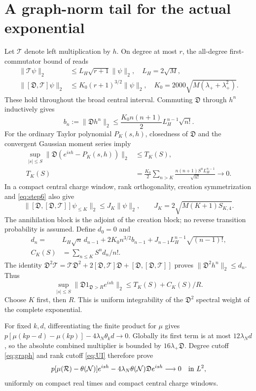 \documentclass[11pt]{article}
\newcommand{\NN}{\mathcal N}
\newcommand{\RR}{\mathcal R}
\newcommand{\DD}{\mathfrak D}
\newcommand{\thN}{\theta(\NN)}
\begin{document}
\newpage
\section{A graph-norm tail for the actual exponential}
Let $\mathcal T$ denote left multiplication by $h$. On degree at most $r$,
the all-degree first-commutator bound of \cite{Rank} reads
\begin{align}
 \|\mathcal T\psi\|_2&\le L_H\sqrt{r+1}\|\psi\|_2,
 \quad L_H=2\sqrt M,\\
 \|[\DD,\mathcal T]\psi\|_2&\le K_0(r+1)^{3/2}\|\psi\|_2,
 \quad K_0=2000\sqrt{M(\lambda_++\lambda_+^2)}.
\end{align}
These hold throughout the broad central interval.
Commuting $\DD$ through $h^n$ inductively gives
\begin{equation}
 b_n:=\|\DD h^n\|_2\le
 \frac{K_0n(n+1)}2 L_H^{n-1}\sqrt{n!}.
\end{equation}
For the ordinary Taylor polynomial $P_K(s,h)$, closedness of $\DD$
and the convergent Gaussian moment series imply
\begin{align}
 \sup_{|s|\le S}\|\DD(e^{ish}-P_K(s,h))\|_2&\le T_K(S),\\
 T_K(S)&=\frac{K_0}2\sum_{n>K}
 \frac{n(n+1)S^nL_H^{n-1}}{\sqrt{n!}}\longrightarrow0.\label{eq:graph}
\end{align}
In a compact central charge window, rank orthogonality, creation
symmetrization and \eqref{eq:step6} also give
\begin{equation}
 \|[\DD,[\DD,\mathcal T]]\psi_{\le K}\|_2
 \le J_K\|\psi\|_2,\qquad J_K=2\sqrt{M(K+1)S_{K,4}}.
\end{equation}
The annihilation block is the adjoint of the creation block; no
reverse transition probability is assumed. Define $d_0=0$ and
\begin{align}
 d_n={}&L_H\sqrt n\,d_{n-1}+2K_0n^{3/2}b_{n-1}
       +J_{n-1}L_H^{n-1}\sqrt{(n-1)!},\\
 C_K(S)&=\sum_{n\le K}S^nd_n/n! .
\end{align}
The identity $\DD^2\mathcal T=\mathcal T\DD^2+
2[\DD,\mathcal T]\DD+[\DD,[\DD,\mathcal T]]$ proves
$\|\DD^2h^n\|_2\le d_n$. Thus
\begin{equation}
 \boxed{\quad\sup_{|s|\le S}
 \|\DD1_{\DD>R}e^{ish}\|_2\le T_K(S)+C_K(S)/R.\quad}\label{eq:UI}
\end{equation}
Choose $K$ first, then $R$. This is uniform integrability of the
$\DD^2$ spectral weight of the complete exponential.

For fixed $k,d$, differentiating the finite product for $\mu$ gives
$p[\mu(kp-d)-\mu(kp)]-4\lambda_N\theta_kd\to0$.
Globally its first term is at most $12\lambda_Nd$, so the absolute
combined multiplier is bounded by $16\lambda_+\DD$.
Degree cutoff \eqref{eq:graph} and rank cutoff \eqref{eq:UI} therefore prove
\begin{equation}
 p[\mu(\RR)-\thN]e^{ish}-4\lambda_N\thN\DD e^{ish}
 \longrightarrow0\quad\hbox{in }L^2,\label{eq:slope}
\end{equation}
uniformly on compact real times and compact central charge windows.
\end{document}
